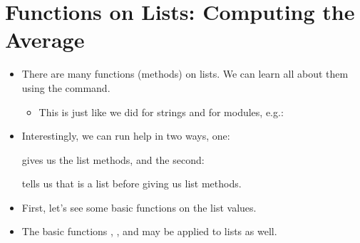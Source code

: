 \documentclass[letterpaper,10pt,english]{sphinxmanual}
\begin{document}
\section{Functions on Lists: Computing the Average}
\label{\detokenize{lecture_notes/lec08_lists1:functions-on-lists-computing-the-average}}\begin{itemize}
\item {} 
There are many functions (methods) on lists. We can learn all about
them using the  command.
\begin{itemize}
\item {} 
This is just like we did for strings and for modules, e.g.:

\begin{sphinxVerbatim}[commandchars=\\\{\}]
 

\end{sphinxVerbatim}

\end{itemize}

\item {} 
Interestingly, we can run help in two ways, one:

\begin{sphinxVerbatim}[commandchars=\\\{\}]
\end{sphinxVerbatim}

gives us the list methods, and the second:

\begin{sphinxVerbatim}[commandchars=\\\{\}]
\end{sphinxVerbatim}

tells us that  is a list before giving us list methods.

\item {} 
First, let’s see some basic functions on the list values.

\item {} 
The basic functions , , and  may be applied to lists as
well.


\end{itemize}
\end{document}

